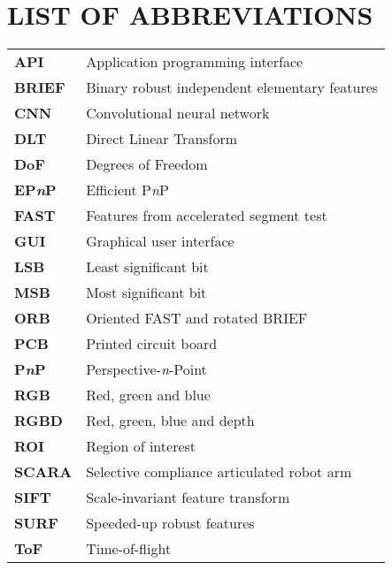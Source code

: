 
\section*{LIST OF ABBREVIATIONS}

\begin{tabular}{p{3cm}l}
  
  	\textbf{API}			& Application programming interface \\
  	\textbf{BRIEF}			& Binary robust independent elementary features \\
	\textbf{CNN} 			& Convolutional neural network \\
	\textbf{DLT}			& Direct Linear Transform \\
	\textbf{DoF}			& Degrees of Freedom \\
	\textbf{EP\textit{n}P}	& Efficient P\textit{n}P \\
	\textbf{FAST}			& Features from accelerated segment test \\
	\textbf{GUI}			& Graphical user interface \\
	\textbf{LSB}			& Least significant bit \\
	\textbf{MSB}			& Most significant bit \\
	\textbf{ORB}			& Oriented FAST and rotated BRIEF \\
	\textbf{PCB}			& Printed circuit board \\
	\textbf{P\textit{n}P}	& Perspective-\textit{n}-Point \\
	\textbf{RGB}			& Red, green and blue \\
	\textbf{RGBD}			& Red, green, blue and depth \\
	\textbf{ROI}			& Region of interest \\
	\textbf{SCARA}			& Selective compliance articulated robot arm \\
	\textbf{SIFT}			& Scale-invariant feature transform \\
	\textbf{SURF}			& Speeded-up robust features \\
	\textbf{ToF}			& Time-of-flight \\
	

\end{tabular}


